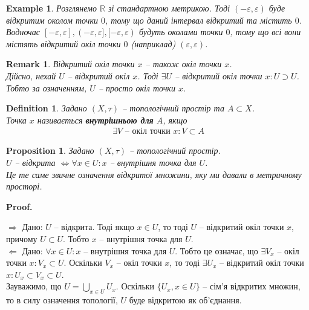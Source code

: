 \documentclass[a4paper, 10pt]{article}
\makeatletter
\def\rightproof{$\boxed{\Rightarrow}$ }
\def\leftproof{$\boxed{\Leftarrow}$ }
\theoremstyle{theoremdd}
\newtheorem{definition}[theorem]{Definition}
\newtheorem{example}[theorem]{Example}
\newtheorem{proposition}[theorem]{Proposition}
\newtheorem{remark}[theorem]{Remark}
\renewenvironment{proof}[1][Proof.\\]{\par
\pushQED{\hfill \qed}%
\normalfont \topsep6\p@\@plus6\p@\relax
\trivlist
\item\relax
{\bfseries
#1\@addpunct{.}}\hspace\labelsep\ignorespaces
}{%
\popQED\endtrivlist\@endpefalse
}
\makeatother
\begin{document}
\begin{example}
Розглянемо $\mathbb{R}$ зі стандартною метрикою. Тоді $(-\varepsilon,\varepsilon)$ буде відкритим околом точки $0$, тому що даний інтервал відкритий та містить $0$.\\
Водночас $[-\varepsilon,\varepsilon], (-\varepsilon,\varepsilon], [-\varepsilon,\varepsilon)$ будуть околами точки $0$, тому що всі вони містять відкритий окіл  точки $0$ (наприклад) $(\varepsilon,\varepsilon)$. 
\end{example}

\begin{remark}
Відкритий окіл точки $x$ -- також окіл точки $x$.\\
Дійсно, нехай $U$ -- відкритий окіл $x$. Тоді $\exists U$ -- відкритий окіл точки $x: U \supset U$. Тобто за означенням, $U$ -- просто окіл точки $x$.
\end{remark}

\begin{definition}
Задано $(X,\tau)$ -- топологічний простір та $A \subset X$.\\
Точка $x$ називається \textbf{внутрішньою для} $A$, якщо
\begin{align*}
\exists V \text{ -- окіл точки } x: V \subset A
\end{align*}
\end{definition}

\begin{proposition}
Задано $(X,\tau)$ -- топологічний простір.\\
$U$ -- відкрита $\iff \forall x \in U: x$ -- внутрішня точка для $U$.\\
\textit{Це те саме звичне означення відкритої множини, яку ми давали в метричному просторі.}
\end{proposition}

\begin{proof}
\rightproof Дано: $U$ -- відкрита. Тоді якщо $x \in U$, то тоді $U$ -- відкритий окіл точки $x$, причому $U \subset U$. Тобто $x$ -- внутрішня точка для $U$.
\bigskip \\
\leftproof Дано: $\forall x \in U: x$ -- внутрішня точка для $U$. Тобто це означає, що $\exists V_x$ -- окіл точки $x: V_x \subset U$. Оскільки $V_x$ -- окіл точки $x$, то тоді $\exists U_x$ -- відкритий окіл точки $x: U_x \subset V_x \subset U$.\\
Зауважимо, що $U = \displaystyle\bigcup_{x \in U} U_x$. Оскільки $\{U_x, x \in U\}$ -- сім'я відкритих множин, то в силу означення топології, $U$ буде відкритою як об'єднання.
\end{proof}
\end{document}
